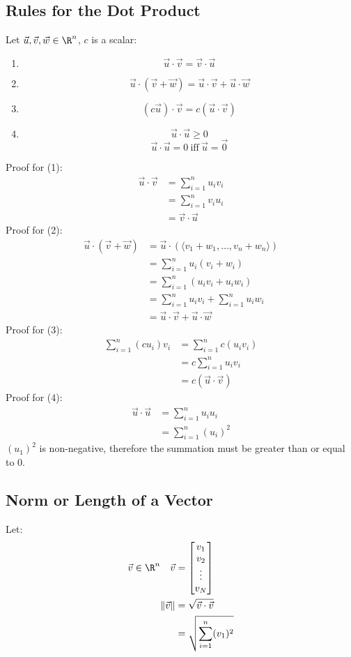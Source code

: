 \documentclass{math}
\begin{document}
\subsection*{Rules for the Dot Product}
Let \( \vec{u},\vec{v},\vec{w}\in\R^n \), \( c \) is a scalar:
\begin{enumerate}
  \item
    \[ \vec{u}\cdot\vec{v} = \vec{v}\cdot\vec{u} \]
  \item
    \[ \vec{u}\cdot(\vec{v}+\vec{w}) =
      \vec{u}\cdot\vec{v}+\vec{u}\cdot\vec{w} \]
  \item
    \[ (c\vec{u})\cdot\vec{v} = c(\vec{u}\cdot\vec{v}) \]
  \item
    \[ \vec{u}\cdot\vec{u}\geq0 \]
    \[ \vec{u}\cdot\vec{u} = 0\ \textrm{iff}\ \vec{u} = \vec{0} \]
\end{enumerate}
Proof for (1):
\begin{align*}
  \vec{u}\cdot\vec{v} &= \sum_{i=1}^nu_iv_i \\
  &= \sum_{i=1}^nv_iu_i \\
  &= \vec{v}\cdot\vec{u}
\end{align*}
Proof for (2):
\begin{align*}
  \vec{u}\cdot(\vec{v}+\vec{w}) &=
    \vec{u}\cdot(\langle v_1+w_1,\dots,v_n+w_n\rangle) \\
  &= \sum_{i=1}^nu_i(v_i+w_i) \\
  &= \sum_{i=1}^n(u_iv_i+u_iw_i) \\
  &= \sum_{i=1}^nu_iv_i+\sum_{i=1}^nu_iw_i \\
  &= \vec{u}\cdot\vec{v}+\vec{u}\cdot\vec{w}
\end{align*}
Proof for (3):
\begin{align*}
  \sum_{i=1}^n(cu_i)v_i &= \sum_{i=1}^nc(u_iv_i) \\
  &= c\sum_{i=1}^nu_iv_i \\
  &= c(\vec{u}\cdot\vec{v})
\end{align*}
Proof for (4):
\begin{align*}
  \vec{u}\cdot\vec{u} &= \sum_{i=1}^nu_iu_i \\
  &= \sum_{i=1}^n(u_i)^2
\end{align*}
\( (u_1)^2 \) is non-negative, therefore the summation must be greater than
or equal to 0.

\subsection*{Norm or Length of a Vector}
Let:
\begin{align*}
  \vec{v}\in\R^n \quad \vec{v} &= \begin{bmatrix}
    v_1 \\ v_2 \\ \vdots \\ v_N
  \end{bmatrix} \\
  \|\vec{v}\| &= \sqrt{\vec{v}\cdot\vec{v}} \\
  &= \sqrt{\sum_{i=1}^n(v_1)^2}
\end{align*}
\end{document}
